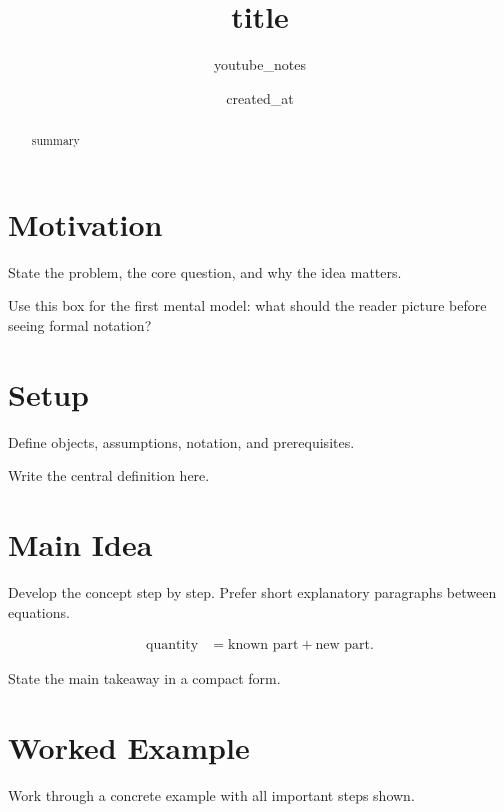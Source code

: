 \documentclass[11pt]{article}
\title{ {{title}} }
\author{youtube\_notes}
\date{ {{created_at}} }
\begin{document}
\maketitle

\begin{abstract}
{{summary}}
\end{abstract}

\tableofcontents

\section{Motivation}

State the problem, the core question, and why the idea matters.

\begin{intuitionbox}
Use this box for the first mental model: what should the reader picture before seeing formal notation?
\end{intuitionbox}

\section{Setup}

Define objects, assumptions, notation, and prerequisites.

\begin{definitionbox}[title=Core Definition]
Write the central definition here.
\end{definitionbox}

\section{Main Idea}

Develop the concept step by step. Prefer short explanatory paragraphs between equations.

\begin{align}
  \text{quantity} &= \text{known part} + \text{new part}.
\end{align}

\begin{resultbox}
State the main takeaway in a compact form.
\end{resultbox}

\section{Worked Example}

\begin{examplebox}
Work through a concrete example with all important steps shown.
\end{examplebox}
\end{document}
